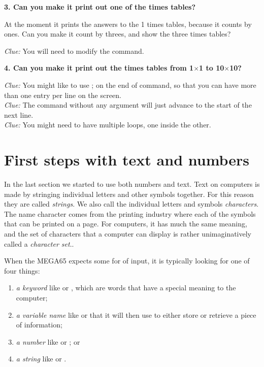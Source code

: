   {\bf 3. Can you make it print out one of the times tables?}

  At the moment it prints the answers to the 1 times tables, because it counts by ones.
  Can you make it count by threes, and show the three times tables?

  {\em Clue:} You will need to modify the  command.

  {\bf 4. Can you make it print out the times tables from 1$\times$1 to 10$\times$10?}

  {\em Clue:} You might like to use ; on the end of  command, so that you can have
  more than one entry per line on the screen.\\
  {\em Clue:} The  command without any argument will just advance to the start of the next line.\\
  {\em Clue:} You might need to have multiple  loops, one inside the other.

\section{First steps with text and numbers}

In the last section we started to use both numbers and text.  Text on computers is made by stringing individual letters
and other symbols together.  For this reason they are called {\em strings}.  We also call the individual letters and
symbols {\em characters}.  The name character comes from the printing industry where each of the symbols that can be
printed on a page. For computers, it has much the same meaning, and the set of characters that a computer can display
is rather unimaginatively called a {\em character set}..

When the MEGA65 expects some for of input, it is typically looking for one of four things:

\begin{enumerate}
\item {\em a keyword} like  or , which are words that have a special meaning to the computer;
\item {\em a variable name} like  or  that it will then use to either store or retrieve a piece of information;
\item {\em a number} like  or ; or
\item {\em a string} like  or .
\end{enumerate}

